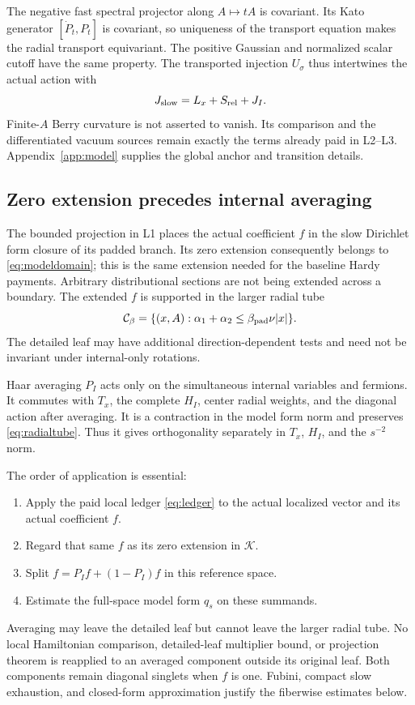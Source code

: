 \documentclass[11pt,letterpaper]{article}
\theoremstyle{definition}\newtheorem{hypothesis}[theorem]{Hypothesis}
\numberwithin{equation}{section}
\begin{document}
The negative fast spectral projector along $A\mapsto tA$ is covariant. Its Kato generator $[\dot P_t,P_t]$ is covariant, so uniqueness of the transport equation makes the radial transport equivariant. The positive Gaussian and normalized scalar cutoff have the same property. The transported injection $U_\sigma$ thus intertwines the actual action with
\begin{equation}
 J_{\rm slow}=L_x+S_{\rm rel}+J_I.\label{eq:slowaction}
\end{equation}
Finite-$A$ Berry curvature is not asserted to vanish. Its comparison and the differentiated vacuum sources remain exactly the terms already paid in L2--L3. Appendix~\ref{app:model} supplies the global anchor and transition details.

\subsection{Zero extension precedes internal averaging}
The bounded projection in L1 places the actual coefficient $f$ in the slow Dirichlet form closure of its padded branch. Its zero extension consequently belongs to \eqref{eq:modeldomain}; this is the same extension needed for the baseline Hardy payments. Arbitrary distributional sections are not being extended across a boundary. The extended $f$ is supported in the larger radial tube
\begin{equation}
 \mathcal C_{\beta}=\{(x,A):\alpha_1+\alpha_2\le\beta_{\rm pad}\nu|x|\}.
 \label{eq:radialtube}
\end{equation}
The detailed leaf may have additional direction-dependent tests and need not be invariant under internal-only rotations.

Haar averaging $P_I$ acts only on the simultaneous internal variables and fermions. It commutes with $T_x$, the complete $H_I$, center radial weights, and the diagonal action after averaging. It is a contraction in the model form norm and preserves \eqref{eq:radialtube}. Thus it gives orthogonality separately in $T_x$, $H_I$, and the $s^{-2}$ norm.

The order of application is essential:
\begin{enumerate}
\item Apply the paid local ledger \eqref{eq:ledger} to the actual localized vector and its actual coefficient $f$.
\item Regard that same $f$ as its zero extension in $\mathscr K$.
\item Split $f=P_If+(1-P_I)f$ in this reference space.
\item Estimate the full-space model form $q_s$ on these summands.
\end{enumerate}
Averaging may leave the detailed leaf but cannot leave the larger radial tube. No local Hamiltonian comparison, detailed-leaf multiplier bound, or projection theorem is reapplied to an averaged component outside its original leaf. Both components remain diagonal singlets when $f$ is one. Fubini, compact slow exhaustion, and closed-form approximation justify the fiberwise estimates below.
\end{document}
